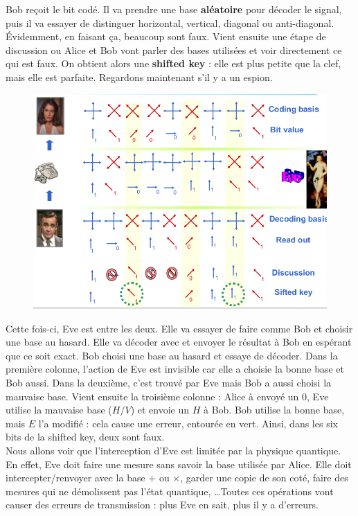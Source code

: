 Bob reçoit le bit codé. Il va prendre une base \textbf{aléatoire} pour décoder le signal, puis il
va essayer de distinguer horizontal, vertical, diagonal ou anti-diagonal. Évidemment, en faisant ça,
beaucoup sont faux. Vient ensuite une étape de discussion ou Alice et Bob vont parler des bases
utilisées et voir directement ce qui est faux. On obtient alors une \textbf{shifted key} : elle est
plus petite que la clef, mais elle est parfaite. Regardons maintenant s'il y a un espion.\\

	\begin{figure}
	\vspace{-5mm}
	\includegraphics[scale=0.2]{ch3/image8}
	\end{figure}
Cette fois-ci, Eve est entre les deux. Elle va essayer de faire comme Bob et choisir une base
au hasard. Elle va décoder avec et envoyer le résultat à Bob en espérant que ce soit exact. 
Bob choisi une base au hasard et essaye de décoder. Dans la première colonne, l'action de Eve
est invisible car elle a choisie la bonne base et Bob aussi. Dans la deuxième, c'est trouvé 
par Eve mais Bob a aussi choisi la mauvaise base. Vient ensuite la troisième
colonne : Alice à envoyé un 0, Eve utilise la mauvaise base ($H/V$) et envoie un $H$ à Bob. Bob
utilise la bonne base, mais $E$ l'a modifié : cela cause une erreur, entourée en vert. Ainsi,
dans les six bits de la shifted key, deux sont faux.\\

Nous allons voir que l'interception d'Eve est limitée par la physique quantique. En effet, Eve
doit faire une mesure sans savoir la base utilisée par Alice. Elle doit intercepter/renvoyer
avec la base $+$ ou $\times$, garder une copie de son coté, faire des mesures qui ne démolissent
pas l'état quantique, \dots Toutes ces opérations vont causer des erreurs de transmission : plus
Eve en sait, plus il y a d'erreurs. \\

